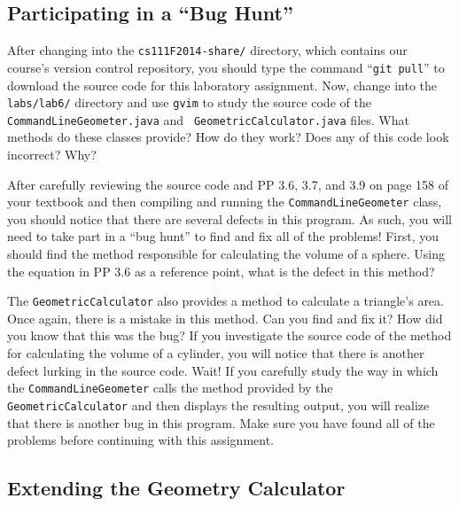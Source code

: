 \vspace*{-.1in}
\subsection*{Participating in a ``Bug Hunt''}

After changing into the {\tt cs111F2014-share/} directory, which contains our course's version control repository, you
should type the command ``{\tt git pull}'' to download the source code for this laboratory assignment. Now, change into
the {\tt labs/lab6/} directory and use {\tt gvim} to study the source code of the {\tt CommandLineGeometer.java} and {\tt
  GeometricCalculator.java} files. What methods do these classes provide? How do they work? Does any of this code look
incorrect? Why?

After carefully reviewing the source code and PP 3.6, 3.7, and 3.9 on page 158 of your textbook and then compiling and
running the {\tt CommandLineGeometer} class, you should notice that there are several defects in this program. As
such, you will need to take part in a ``bug hunt'' to find and fix all of the problems! First, you should find the
method responsible for calculating the volume of a sphere. Using the equation in PP 3.6 as a reference point, what is
the defect in this method?

The {\tt GeometricCalculator} also provides a method to calculate a triangle's area.  Once again, there is a
mistake in this method.  Can you find and fix it? How did you know that this was the bug? If you investigate the source
code of the method for calculating the volume of a cylinder, you will notice that there is another defect lurking in the
source code. Wait! If you carefully study the way in which the {\tt CommandLineGeometer} calls the method
provided by the {\tt GeometricCalculator} and then displays the resulting output, you will realize that there is another
bug in this program. Make sure you have found all of the problems before continuing with this assignment.

\vspace*{-.1in}
\subsection*{Extending the Geometry Calculator}

